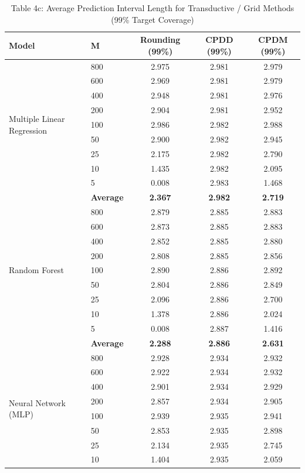 \documentclass[11pt,a4paper]{article}
\begin{document}
\begin{table}[H]
\centering
\caption{Table 4c: Average Prediction Interval Length for Transductive / Grid Methods (99\% Target Coverage)}
\label{tab:4c}
\scriptsize
\begin{tabular}{llccc}
\toprule
Model & M & Rounding (99\%) & CPDD (99\%) & CPDM (99\%) \\
\midrule
\multirow{9}{*}{Multiple Linear Regression}
 & 800 & 2.975 & 2.981 & 2.979 \\
 & 600 & 2.969 & 2.981 & 2.979 \\
 & 400 & 2.948 & 2.981 & 2.976 \\
 & 200 & 2.904 & 2.981 & 2.952 \\
 & 100 & 2.986 & 2.982 & 2.988 \\
 & 50  & 2.900 & 2.982 & 2.945 \\
 & 25  & 2.175 & 2.982 & 2.790 \\
 & 10  & 1.435 & 2.982 & 2.095 \\
 & 5   & 0.008 & 2.983 & 1.468 \\
 & \textbf{Average} & \textbf{2.367} & \textbf{2.982} & \textbf{2.719} \\
\midrule
\multirow{9}{*}{Random Forest}
 & 800 & 2.879 & 2.885 & 2.883 \\
 & 600 & 2.873 & 2.885 & 2.883 \\
 & 400 & 2.852 & 2.885 & 2.880 \\
 & 200 & 2.808 & 2.885 & 2.856 \\
 & 100 & 2.890 & 2.886 & 2.892 \\
 & 50  & 2.804 & 2.886 & 2.849 \\
 & 25  & 2.096 & 2.886 & 2.700 \\
 & 10  & 1.378 & 2.886 & 2.024 \\
 & 5   & 0.008 & 2.887 & 1.416 \\
 & \textbf{Average} & \textbf{2.288} & \textbf{2.886} & \textbf{2.631} \\
\midrule
\multirow{9}{*}{Neural Network (MLP)}
 & 800 & 2.928 & 2.934 & 2.932 \\
 & 600 & 2.922 & 2.934 & 2.932 \\
 & 400 & 2.901 & 2.934 & 2.929 \\
 & 200 & 2.857 & 2.934 & 2.905 \\
 & 100 & 2.939 & 2.935 & 2.941 \\
 & 50  & 2.853 & 2.935 & 2.898 \\
 & 25  & 2.134 & 2.935 & 2.745 \\
 & 10  & 1.404 & 2.935 & 2.059 \\

\end{tabular}
\end{table}
\end{document}

